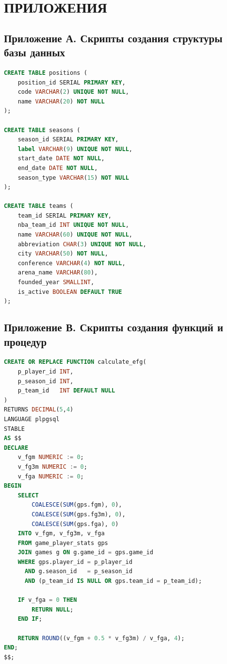 \chapter*{ПРИЛОЖЕНИЯ}

\section*{Приложение А. Скрипты создания структуры базы данных}

\renewcommand{\thelstlisting}{А.\arabic{lstlisting}}
\setcounter{lstlisting}{0}

\begin{lstlisting}[language=SQL]
CREATE TABLE positions (
    position_id SERIAL PRIMARY KEY,
    code VARCHAR(2) UNIQUE NOT NULL,
    name VARCHAR(20) NOT NULL
);

CREATE TABLE seasons (
    season_id SERIAL PRIMARY KEY,
    label VARCHAR(9) UNIQUE NOT NULL,
    start_date DATE NOT NULL,
    end_date DATE NOT NULL,
    season_type VARCHAR(15) NOT NULL
);

CREATE TABLE teams (
    team_id SERIAL PRIMARY KEY,
    nba_team_id INT UNIQUE NOT NULL,
    name VARCHAR(60) UNIQUE NOT NULL,
    abbreviation CHAR(3) UNIQUE NOT NULL,
    city VARCHAR(50) NOT NULL,
    conference VARCHAR(4) NOT NULL,
    arena_name VARCHAR(80),
    founded_year SMALLINT,
    is_active BOOLEAN DEFAULT TRUE
);
\end{lstlisting}



\section*{Приложение В. Скрипты создания функций и процедур}

\renewcommand{\thelstlisting}{В.\arabic{lstlisting}}
\setcounter{lstlisting}{0}

\begin{lstlisting}[language=SQL]
CREATE OR REPLACE FUNCTION calculate_efg(
    p_player_id INT,
    p_season_id INT,
    p_team_id   INT DEFAULT NULL
)
RETURNS DECIMAL(5,4)
LANGUAGE plpgsql
STABLE
AS $$
DECLARE
    v_fgm NUMERIC := 0;
    v_fg3m NUMERIC := 0;
    v_fga NUMERIC := 0;
BEGIN
    SELECT
        COALESCE(SUM(gps.fgm), 0),
        COALESCE(SUM(gps.fg3m), 0),
        COALESCE(SUM(gps.fga), 0)
    INTO v_fgm, v_fg3m, v_fga
    FROM game_player_stats gps
    JOIN games g ON g.game_id = gps.game_id
    WHERE gps.player_id = p_player_id
      AND g.season_id   = p_season_id
      AND (p_team_id IS NULL OR gps.team_id = p_team_id);

    IF v_fga = 0 THEN
        RETURN NULL;
    END IF;

    RETURN ROUND((v_fgm + 0.5 * v_fg3m) / v_fga, 4);
END;
$$;
\end{lstlisting}

